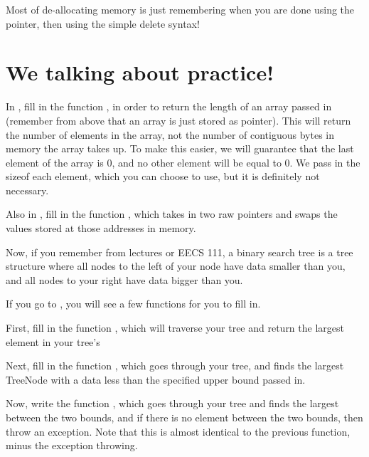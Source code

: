\documentclass{tufte-handout}
\begin{document}

Most of de-allocating memory is just remembering when you are done using the pointer, then using the simple delete syntax!


\section{We talking about practice!}


In , fill in the function , in order to return the length of an array passed in (remember from above that an array is just stored as pointer).
This will return the number of elements in the array, not the number of contiguous bytes in memory the array takes up.
To make this easier, we will guarantee that the last element of the array is 0, and no other element will be equal to 0.
We pass in the sizeof each element, which you can choose to use, but it is definitely not necessary.

Also in , fill in the function , which takes in two raw pointers and swaps the values stored at those addresses in memory.

Now, if you remember from lectures or EECS 111, a binary search tree is a tree structure where all nodes to the left of your node have data smaller than you, and all nodes to your right have data bigger than you.

If you go to , you will see a few functions for you to fill in.

First, fill in the function , which will traverse your tree and return the largest element in your tree's 

Next, fill in the function , which goes through your tree, and finds the largest TreeNode with a data less than the specified upper bound passed in.

Now, write the function , which goes through your tree and finds the largest  between the two bounds, and if there is no element between the two bounds, then throw an exception.
Note that this is almost identical to the previous function, minus the exception throwing.
\end{document}
